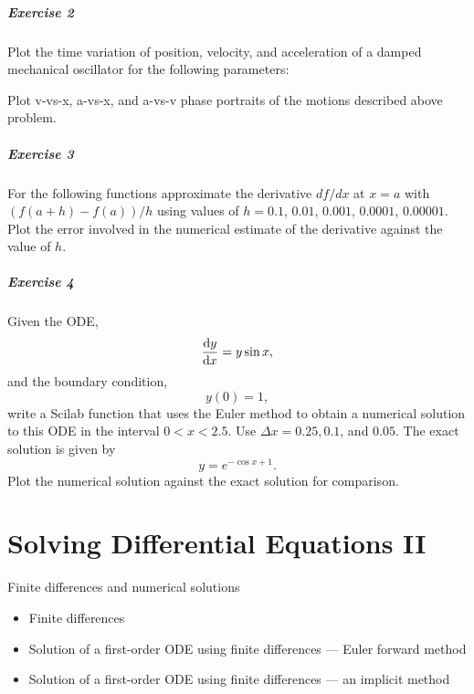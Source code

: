 \documentclass[a4paper]{book}
\begin{document}
\paragraph{Exercise 2}
Plot the time variation of position, velocity, and acceleration 
of a damped mechanical
oscillator for the following parameters:

Plot v-vs-x, a-vs-x, and a-vs-v phase portraits of the motions 
described above problem.





\paragraph{Exercise 3}
For the following functions approximate the derivative $df/dx$ at 
$x = a$ with $(f(a+h)-f(a))/h$ using values of $h = 0.1$, $0.01$, $0.001$, 
$0.0001$, $0.00001$. Plot the error involved in the numerical estimate 
of the derivative against the value of $h$.



\paragraph{Exercise 4}
Given the ODE,
\[
\dv{y}{x}=y\sin{x},
\]
and the boundary condition,
\[y(0) = 1,\]
write a Scilab function that uses the Euler method to obtain a numerical 
solution to this ODE in the interval $0 < x < 2.5$. Use $\Delta x = 0.25, 
0.1$, and $0.05$.
The exact solution is given by
\[
y = e^{-\cos{x}+1}.
\]
Plot the numerical solution against the exact solution for comparison.



\chapter{Solving Differential Equations II}
Finite differences and numerical solutions
\begin{itemize}
\item Finite differences
\item Solution of a first-order ODE using finite differences --- Euler forward method
\item Solution of a first-order ODE using finite differences --- an implicit method
\end{itemize}
\end{document}
